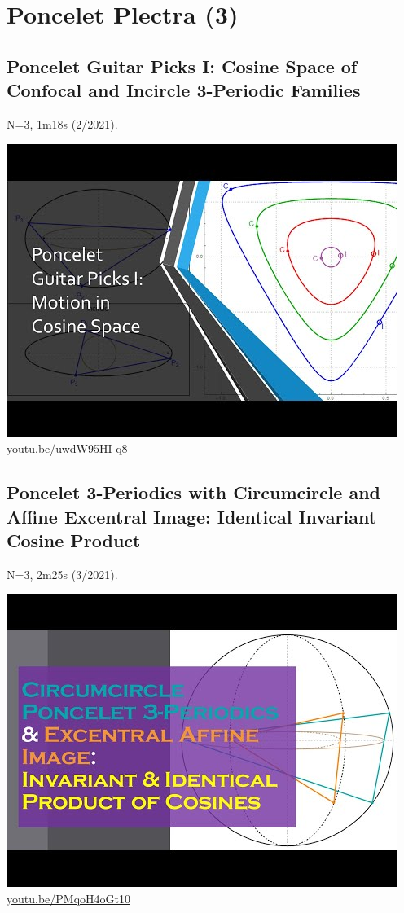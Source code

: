 \documentclass[12pt]{amsart}
\begin{document}
\section{Poncelet Plectra (3)}

\subsection{Poncelet Guitar Picks I: Cosine Space of Confocal and Incircle 3-Periodic Families}
\label{vid:uwdW95HI-q8}
\noindent N=3, 1m18s (2/2021). 
\begin{center}\includegraphics[width=.5\textwidth]{pics/uwdW95HI-q8.jpg} \\ 
\href{https://youtu.be/uwdW95HI-q8}{\url{youtu.be/uwdW95HI-q8}}\end{center}
% 
\subsection{Poncelet 3-Periodics with Circumcircle and Affine Excentral Image: Identical Invariant Cosine Product}
\label{vid:PMqoH4oGt10}
\noindent N=3, 2m25s (3/2021). 
\begin{center}\includegraphics[width=.5\textwidth]{pics/PMqoH4oGt10.jpg} \\ 
\href{https://youtu.be/PMqoH4oGt10}{\url{youtu.be/PMqoH4oGt10}}\end{center}
% 
\end{document}
